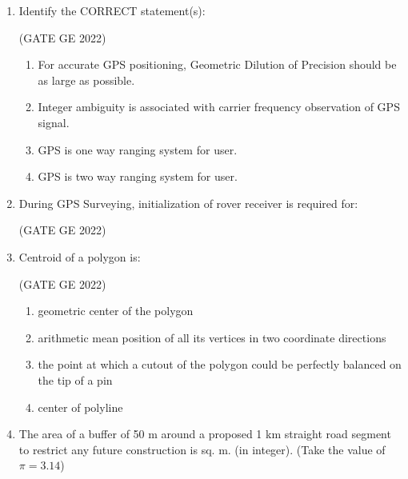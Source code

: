 \documentclass[journal,12pt,onecolumn]{IEEEtran}
\theoremstyle{remark}
\begin{document}
\begin{enumerate}
\item Identify the CORRECT statement(s):

\hfill (GATE GE 2022)

\begin{enumerate}
    \item For accurate GPS positioning, Geometric Dilution of Precision should be as large as possible.
    \item Integer ambiguity is associated with carrier frequency observation of GPS signal.
    \item GPS is one way ranging system for user.
    \item GPS is two way ranging system for user.
\end{enumerate}

\item During GPS Surveying, initialization of rover receiver is required for:

\hfill (GATE GE 2022)

\begin{enumerate}
\end{enumerate}

\item Centroid of a polygon is:

\hfill (GATE GE 2022)

\begin{enumerate}
    \item geometric center of the polygon
    \item arithmetic mean position of all its vertices in two coordinate directions
    \item the point at which a cutout of the polygon could be perfectly balanced on the tip of a pin
    \item center of polyline
\end{enumerate}

\item The area of a buffer of 50 m around a proposed 1 km straight road segment to restrict any future construction is \makebox[1cm]{\hrulefill} sq. m. (in integer). (Take the value of $\pi = 3.14$)


\end{enumerate}
\end{document}
